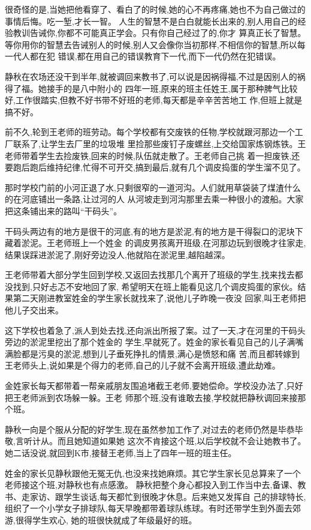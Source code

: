 ﻿\documentclass[12pt]{article}
\begin{document}
很奇怪的是,当她把他看穿了、看白了的时候,她的心不再疼痛,她也不为自己做过的事情后悔。吃一堑,才长一智。
人生的智慧不是白白就能长出来的,别人用自己的经验教训告诫你,你都不可能真正学会。只有你自己经过了的,你才
算真正长了智慧。等你用你的智慧去告诫别人的时候,别人又会像你当初那样,不相信你的智慧,所以每一代人都在犯
错误,都在用自己的错误教育下一代,而下一代仍然在犯错误。

静秋在农场还没干到半年,就被调回来教书了,可以说是因祸得福,不过是因别人的祸得了福。她接手的是八中附小的
四年一班,原来的班主任姓王,属于那种脾气比较好,工作很踏实,但教不好书带不好班的老师,每天都是辛辛苦苦地工
作,但班上就是搞不好。

前不久,轮到王老师的班劳动。每个学校都有交废铁的任物,学校就跟河那边一个工厂联系了,让学生去厂里的垃圾堆
里捡那些废钉子废螺丝,上交给国家炼钢炼铁。王老师带着学生去捡废铁,回来的时候,队伍就走散了。王老师自己挑
着一担废铁,还要跑后跑后维持纪律,忙得不可开交,搞到最后,就有几个调皮捣蛋的学生溜不见了。

那时学校门前的小河正退了水,只剩很窄的一道河沟。人们就用草袋装了煤渣什么的在河底铺出一条路,让过河的人
从河坡走到河沟那里去乘一种很小的渡船。大家把这条铺出来的路叫``干码头''。

干码头两边有的地方是很干的河底,有的地方是淤泥,有的地方是干得裂口的泥块下藏着淤泥。王老师班上一个姓金
的调皮男孩离开班级,在河那边玩到很晚才往家走,结果误踩进淤泥了,刚好旁边没人,他就陷在淤泥里,越陷越深。

王老师带着大部分学生回到学校,又返回去找那几个离开了班级的学生,找来找去都没找到,只好忐忑不安地回了家,
希望明天在班上能看见这几个调皮捣蛋的家伙。结果第二天刚进教室姓金的学生家长就找来了,说他儿子昨晚一夜没
回家,叫王老师把他儿子交出来。

这下学校也着急了,派人到处去找,还向派出所报了案。过了一天,才在河里的干码头旁边的淤泥里挖出了那个姓金的
学生,早就死了。姓金的家长看见自己的儿子满嘴满脸都是污臭的淤泥,想到儿子垂死挣扎的情景,满心是愤怒和痛
苦,而且都转嫁到王老师头上,说如果是个得力的老师,自己的儿子就不会离开班级,遭此劫难。

金姓家长每天都带着一帮亲戚朋友围追堵截王老师,要她偿命。学校没办法了,只好把王老师派到农场躲一躲。王老
师那个班,没有谁敢去接,学校就把静秋调回来接那个班。

静秋一向是个服从分配的好学生,现在虽然参加工作了,对过去的老师仍然是毕恭毕敬,言听计从。而且她知道如果她
这次不肯接这个班,以后学校就不会让她教书了。她二话没说,就回到K市,接替王老师,当上了四年一班的班主任。

姓金的家长见静秋跟他无冤无仇,也没来找她麻烦。其它学生家长见总算来了一个老师接这个班,对静秋也有点感激。
静秋把整个身心都投入到工作当中去,备课、教书、走家访、跟学生谈话,每天都忙到很晚才休息。后来她又发挥自
己的排球特长,组织了一个小学女子排球队,每天早晚都带着球队练球。有时还带学生到外面去郊游,很得学生欢心,
她的班很快就成了年级最好的班。
\end{document}
